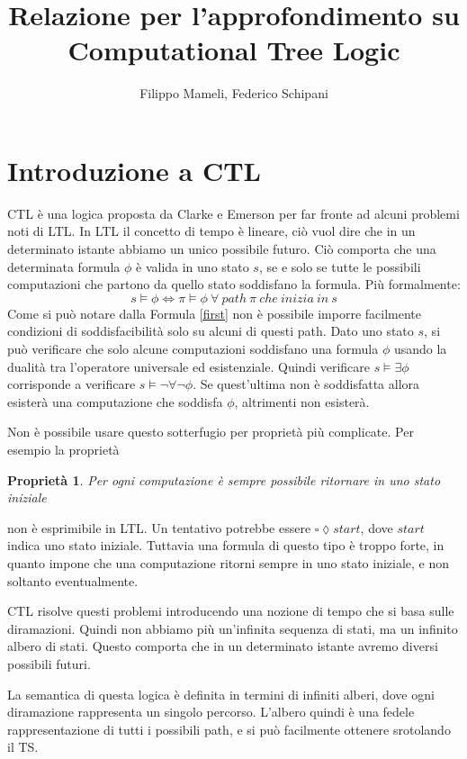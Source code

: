 \documentclass[a4paper, 10pt]{article}
\title{Relazione per l'approfondimento su Computational Tree Logic}
\author{Filippo Mameli, Federico Schipani}
\newtheorem{prop}{Proprietà}
\numberwithin{equation}{theor}
\begin{document}
\maketitle
\tableofcontents
\section{Introduzione a \ac*{CTL}}
\acf{CTL} è una logica proposta da Clarke e Emerson per far fronte ad alcuni problemi noti di \ac{LTL}. In \ac{LTL} il concetto di tempo è lineare, ciò vuol dire che in un determinato istante abbiamo un unico possibile futuro. Ciò comporta che una determinata formula $\phi$ è valida in uno stato $s$, se e solo se tutte le possibili computazioni che partono da quello stato soddisfano la formula. Più formalmente:
\begin{equation}\label{first}
    s \models \phi \iff \pi \models \phi \ \forall \  path \  \pi \ che\  inizia\  in\  s
\end{equation}
Come si può notare dalla Formula \eqref{first} non è possibile imporre facilmente condizioni di soddisfacibilità solo su alcuni di questi path. Dato uno stato $s$, si può verificare che solo alcune computazioni soddisfano una formula $\phi$  usando la dualità tra l'operatore universale ed esistenziale. Quindi verificare  $ s \models  \exists \phi $ corrisponde a verificare $s \models \neg \forall \neg \phi $. Se quest'ultima non è soddisfatta allora esisterà una computazione che soddisfa $\phi$, altrimenti non esisterà. \par
Non è possibile usare questo sotterfugio per proprietà più complicate. Per esempio la proprietà
\begin{prop}
\label{prop:first}
Per ogni computazione è sempre possibile ritornare in uno stato iniziale 
\end{prop}
non è esprimibile in \ac{LTL}. Un tentativo potrebbe essere $\square\lozenge start$, dove $start$ indica uno stato iniziale. Tuttavia una formula di questo tipo è troppo forte, in quanto impone che una computazione ritorni sempre in uno stato iniziale, e non soltanto eventualmente. \par
\ac{CTL} risolve questi problemi introducendo una nozione di tempo che si basa sulle diramazioni. Quindi non abbiamo più un'infinita sequenza di stati, ma un infinito albero di stati. Questo comporta che in un determinato istante avremo diversi possibili futuri.\par
La semantica di questa logica è definita in termini di infiniti alberi, dove ogni diramazione rappresenta un singolo percorso. L'albero quindi è una fedele rappresentazione di tutti i possibili path, e si può facilmente ottenere srotolando il \ac{TS}.\par
\end{document}
